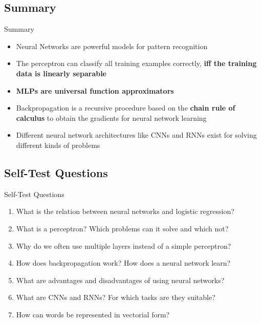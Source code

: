 \subsection{Summary}

\begin{frame}{Summary}{}
	\begin{itemize}
		\item Neural Networks are powerful models for pattern recognition
		\item The perceptron can classify all training examples correctly, \textbf{iff the training data is linearly separable}
		\item \textbf{MLPs are universal function approximators}
		\item Backpropagation is a recursive procedure based on the \textbf{chain rule of calculus} to obtain the gradients for neural network learning
		\item Different neural network architectures like CNNs and RNNs exist for solving different kinds of problems
	\end{itemize}
\end{frame}


\subsection{Self-Test Questions}

\begin{frame}{Self-Test Questions}{}\important
	\begin{enumerate}
		\item What is the relation between neural networks and logistic regression?
		\item What is a perceptron? Which problems can it solve and which not?
		\item Why do we often use multiple layers instead of a simple perceptron?
		\item How does backpropagation work? How does a neural network learn?
		\item What are advantages and disadvantages of using neural networks?
		\item What are CNNs and RNNs? For which tasks are they suitable?
		\item How can words be represented in vectorial form?
	\end{enumerate}
\end{frame}


